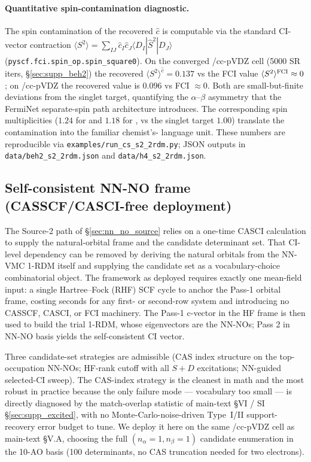 \documentclass[journal=jctcce,manuscript=suppinfo,layout=traditional]{achemso}
\begin{document}
\paragraph{Quantitative spin-contamination diagnostic.}
The spin contamination of the recovered $\widehat c$ is computable
via the standard CI-vector contraction
$\langle S^2\rangle = \sum_{IJ} \widehat c_I \widehat c_J
\langle D_I | \hat S^2 | D_J\rangle$ (\texttt{pyscf.fci.spin\_op.spin\_square0}).
On the converged /cc-pVDZ cell (5000 SR iters,
\S\ref{sec:supp_beh2}) the recovered
$\langle S^2\rangle^{\widehat c} = 0.137$ vs the FCI value
$\langle S^2\rangle^{\rm FCI} \approx 0$; on /cc-pVDZ
the recovered value is $0.096$ vs FCI $\approx 0$. Both are
small-but-finite deviations from the singlet target, quantifying the
$\alpha$--$\beta$ asymmetry that the FermiNet separate-spin path
architecture introduces. The corresponding spin multiplicities
($1.24$ for  and $1.18$ for , vs the singlet target
$1.00$) translate the contamination into the familiar chemist's-
language unit. These numbers are reproducible via
\texttt{examples/run\_cs\_s2\_2rdm.py}; JSON outputs in
\texttt{data/beh2\_s2\_2rdm.json} and \texttt{data/h4\_s2\_2rdm.json}.

\subsection{Self-consistent NN-NO frame (CASSCF/CASCI-free deployment)}
\label{sec:nn_no_self_consistent}

The Source-2 path of \S\ref{sec:nn_no_source} relies on a one-time
CASCI calculation to supply the natural-orbital frame and the candidate
determinant set. That CI-level dependency can be removed by deriving
the natural orbitals from the NN-VMC 1-RDM itself and supplying the
candidate set as a vocabulary-choice combinatorial object. The
framework as deployed requires exactly one mean-field input:
a single Hartree--Fock (RHF) SCF cycle to anchor the Pass-1 orbital
frame, costing seconds for any first- or second-row system and
introducing no CASSCF, CASCI, or FCI machinery. The Pass-1 c-vector
in the HF frame is then used to build the trial 1-RDM, whose
eigenvectors are the NN-NOs; Pass 2 in NN-NO basis yields the
self-consistent CI vector.

Three candidate-set strategies are admissible (CAS index structure on
the top-occupation NN-NOs; HF-rank cutoff with all $S{+}D$ excitations;
NN-guided selected-CI sweep). The CAS-index strategy is the cleanest
in math and the most robust in practice because the only failure mode
--- vocabulary too small --- is directly diagnosed by the
match-overlap statistic of main-text \S VI / SI \S\ref{sec:supp_excited}, with no
Monte-Carlo-noise-driven Type~I/II support-recovery error budget to
tune. We deploy it here on the same /cc-pVDZ cell as
main-text \S V.A, choosing the full $(n_\alpha{=}1, n_\beta{=}1)$
candidate enumeration in the 10-AO basis (100 determinants, no CAS
truncation needed for two electrons).
\end{document}
